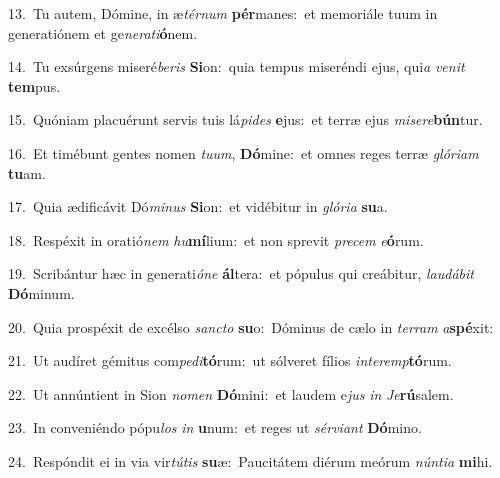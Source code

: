 {\numbfont\textcolor{\numbcolor}{13.}}~Tu autem, Dómine, in æ\-\textit{tér}\-\textit{num} \textbf{pér}\-manes:~\star et memoriále tuum in generatiónem et ge\-\textit{ne}\-\textit{ra}\textit{ti}\textbf{ó}nem.\par
{\numbfont\textcolor{\numbcolor}{14.}}~Tu exsúrgens miseré\-\textit{be}\-\textit{ris} \textbf{Si}\-on:~\star quia tempus miseréndi ejus, qui\textit{a} \textit{ve}\-\textit{nit} \textbf{tem}\-pus.\par
{\numbfont\textcolor{\numbcolor}{15.}}~Quóniam placuérunt servis tuis lá\-\textit{pi}\-\textit{des} \textbf{e}\-jus:~\star et terræ ejus \textit{mi}\-\textit{se}\textit{re}\textbf{bún}tur.\par
{\numbfont\textcolor{\numbcolor}{16.}}~Et timébunt gentes nomen \textit{tu}\-\textit{um}, \textbf{Dó}\-mine:~\star et omnes reges terræ \textit{gló}\-\textit{ri}\textit{am} \textbf{tu}\-am.\par
{\numbfont\textcolor{\numbcolor}{17.}}~Quia ædificávit Dó\-\textit{mi}\-\textit{nus} \textbf{Si}\-on:~\star et vidébitur in \textit{gló}\-\textit{ri}\textit{a} \textbf{su}\-a.\par
{\numbfont\textcolor{\numbcolor}{18.}}~Respéxit in oratió\textit{nem} \textit{hu}\-\textbf{mí}lium:~\star et non sprevit \textit{pre}\-\textit{cem} \textit{e}\-\textbf{ó}rum.\par
{\numbfont\textcolor{\numbcolor}{19.}}~Scribántur hæc in generati\-\textit{ó}\-\textit{ne} \textbf{ál}\-tera:~\star et pópulus qui creábitur, \textit{lau}\-\textit{dá}\textit{bit} \textbf{Dó}\-minum.\par
{\numbfont\textcolor{\numbcolor}{20.}}~Quia prospéxit de excélso \textit{sanc}\-\textit{to} \textbf{su}\-o:~\star Dóminus de cælo in \textit{ter}\-\textit{ram} \textit{a}\-\textbf{spé}xit:\par
{\numbfont\textcolor{\numbcolor}{21.}}~Ut audíret gémitus com\-\textit{pe}\-\textit{di}\textbf{tó}rum:~\star ut sólveret fílios \textit{in}\-\textit{ter}\textit{emp}\textbf{tó}rum.\par
{\numbfont\textcolor{\numbcolor}{22.}}~Ut annúntient in Sion \textit{no}\-\textit{men} \textbf{Dó}\-mini:~\star et laudem e\textit{jus} \textit{in} \textit{Je}\-\textbf{rú}salem.\par
{\numbfont\textcolor{\numbcolor}{23.}}~In conveniéndo pópu\textit{los} \textit{in} \textbf{u}\-num:~\star et reges ut \textit{sér}\-\textit{vi}\textit{ant} \textbf{Dó}\-mino.\par
{\numbfont\textcolor{\numbcolor}{24.}}~Respóndit ei in via vir\-\textit{tú}\-\textit{tis} \textbf{su}\-æ:~\star Paucitátem diérum meórum \textit{nún}\-\textit{ti}\textit{a} \textbf{mi}\-hi.\par
